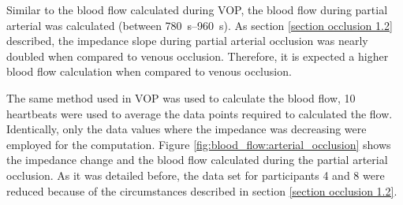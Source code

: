 Similar to the blood flow calculated during VOP, the blood flow during partial arterial was calculated (between \SIrange{780}{960}{\second}). As section \ref{section occlusion 1.2} described, the impedance slope during partial arterial occlusion was nearly doubled when compared to venous occlusion. Therefore, it is expected a higher blood flow calculation when compared to venous occlusion. 

The same method used in VOP was used to calculate the blood flow, 10 heartbeats were used to average the data points required to calculated the flow. Identically, only the data values where the impedance was decreasing were employed for the computation. Figure \ref{fig:blood_flow:arterial_occlusion} shows the impedance change and the blood flow calculated during the partial arterial occlusion.  As it was detailed before, the data set for participants 4 and 8 were reduced because of the circumstances described in section \ref{section occlusion 1.2}. 

